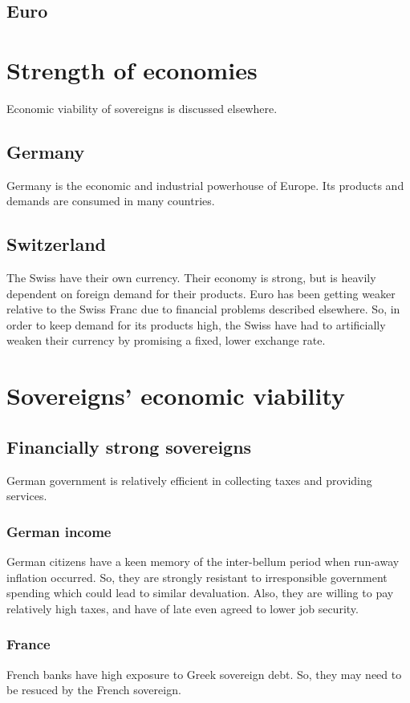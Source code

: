 \documentclass[oneside, article]{memoir}
\begin{document}
\subsection{Euro}
\tbc

\section{Strength of economies}
Economic viability of sovereigns is discussed elsewhere.

\subsection{Germany}
Germany is the economic and industrial powerhouse of Europe. Its products and demands are consumed in many countries.

\subsection{Switzerland}
The Swiss have their own currency. Their economy is strong, but is heavily dependent on foreign demand for their products. Euro has been getting weaker relative to the Swiss Franc due to financial problems described elsewhere. So, in order to keep demand for its products high, the Swiss have had to artificially weaken their currency by promising a fixed, lower exchange rate.

\section{Sovereigns' economic viability}
\subsection{Financially strong sovereigns}
German government is relatively efficient in collecting taxes and providing services.

\subsubsection{German income}
German citizens have a keen memory of the inter-bellum period when run-away inflation occurred. So, they are strongly resistant to irresponsible government spending which could lead to similar devaluation. Also, they are willing to pay relatively high taxes, and have of late even agreed to lower job security.

\subsubsection{France}
French banks have high exposure to Greek sovereign debt. So, they may need to be resuced by the French sovereign.
\end{document}
